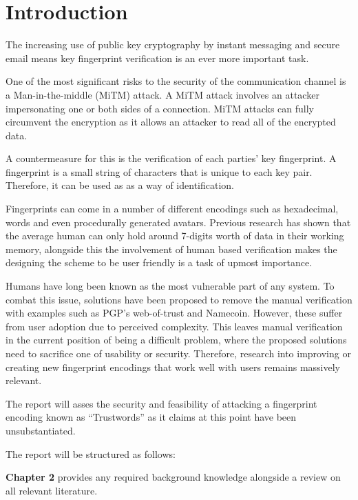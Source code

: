 \chapter{Introduction}
\label{cha:Introduction}

The increasing use of public key cryptography by instant messaging and secure email means key fingerprint  verification is an ever more important task. 

One of the most significant risks to the security of the communication channel is a Man-in-the-middle (MiTM) attack. A MiTM attack involves an attacker impersonating one or both sides of a connection. MiTM attacks can fully circumvent the encryption as it allows an attacker to read all of the encrypted data. 

A countermeasure for this is the verification of each parties' key fingerprint. A fingerprint is a small string of characters that is unique to each key pair. Therefore, it can be used as as a way of identification. 

Fingerprints can come in a number of different encodings such as hexadecimal, words and even procedurally generated avatars. Previous research has shown that the average human can only hold around 7-digits worth of data in their working memory\cite{miller1956magical}, alongside this the involvement of human based verification makes the designing the scheme to be user friendly is a task of upmost importance.

Humans have long been known as the most vulnerable part of any system. To combat this issue, solutions have been proposed to remove the manual verification with examples such as PGP's web-of-trust\cite{callas1998openpgp} and Namecoin\cite{kalodner2015empirical}. However, these suffer from user adoption due to perceived complexity. This leaves manual verification in the current position of being a difficult problem, where the proposed solutions need to sacrifice one of usability or security. Therefore, research into improving or creating new fingerprint encodings that work well with users remains massively relevant.

The report will asses the security and feasibility of attacking a fingerprint encoding known as ``Trustwords'' as it claims at this point have been unsubstantiated. 

The report will be structured as follows:

\textbf{Chapter 2} provides any required background knowledge alongside a review on all relevant literature.

